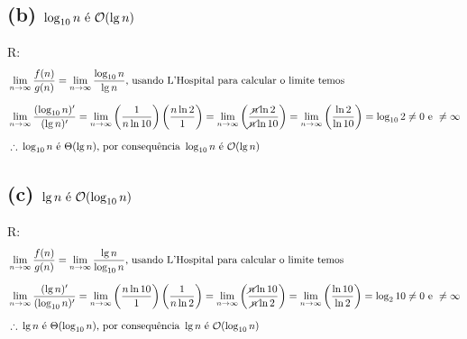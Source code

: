 
  \subsection*{(b) $\log_{10} n \text{ é } \mathcal{O}(\lg n)$}
  R:
  \begin{equation*}
    \setlength{\jot}{10pt}
    \begin{aligned}
    &\lim_{n \to\infty} \frac{f(n)}{g(n)} = \lim_{n \to\infty} \frac{\log_{10} n}{\lg n} \text{, usando L'Hospital para calcular o limite temos} \\
    &\lim_{n \to\infty} \frac{(\log_{10} n)'}{(\lg n)'} = \lim_{n \to\infty} \left(\frac{1}{n \ln 10}\right) \left(\frac{n \ln 2}{1}\right) = \lim_{n \to\infty} \left(\frac{\cancel{n} \ln 2}{\cancel{n} \ln 10}\right) = \lim_{n \to\infty} \left(\frac{\ln 2}{\ln 10}\right) = \log_{10} 2 \neq 0 \text{ e } \neq \infty \\
    &\therefore\: \log_{10} n \text{ é } \Theta(\lg n) \text{, por consequência } \log_{10} n \text{ é } \bigO(\lg n)
  \end{aligned}\end{equation*}


  \subsection*{(c) $\lg n \text{ é } \mathcal{O}(\log_{10} n)$}
  R:
  \begin{equation*}
    \setlength{\jot}{10pt}
    \begin{aligned}
    &\lim_{n \to\infty} \frac{f(n)}{g(n)} = \lim_{n \to\infty} \frac{\lg n}{\log_{10} n} \text{, usando L'Hospital para calcular o limite temos} \\
    &\lim_{n \to\infty} \frac{(\lg n)'}{(\log_{10} n)'} = \lim_{n \to\infty} \left(\frac{n \ln 10}{1}\right) \left(\frac{1}{n \ln 2}\right) = \lim_{n \to\infty} \left(\frac{\cancel{n} \ln 10}{\cancel{n} \ln 2}\right) = \lim_{n \to\infty} \left(\frac{\ln 10}{\ln 2}\right) = \log_{2} 10 \neq 0 \text{ e } \neq \infty \\
    &\therefore\: \lg n \text{ é } \Theta(\log_{10} n) \text{, por consequência } \lg n \text{ é } \bigO(\log_{10} n)
  \end{aligned}\end{equation*}
